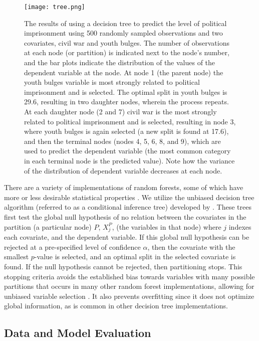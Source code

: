 \documentclass[12pt]{article}
\begin{document}
\begin{figure}[!htpb]
\centering
\texttt{[image: tree.png]}
\caption{The results of using a decision tree to predict the level of political imprisonment using 500 randomly sampled observations and two covariates, civil war and youth bulges. The number of observations at each node (or partition) is indicated next to the node's number, and the bar plots indicate the distribution of the values of the dependent variable at the node. At node 1 (the parent node) the youth bulges variable is most strongly related to political imprisonment and is selected. The optimal split in youth bulges is 29.6, resulting in two daughter nodes, wherein the process repeats. At each daughter node (2 and 7) civil war is the most strongly related to political imprisonment and is selected, resulting in node 3, where youth bulges is again selected (a new split is found at 17.6), and then the terminal nodes (nodes 4, 5, 6, 8, and 9), which are used to predict the dependent variable (the most common category in each terminal node is the predicted value). Note how the variance of the distribution of dependent variable decreases at each node.}
\label{fig:tree}
\end{figure}

There are a variety of implementations of random forests, some of which have more or less desirable statistical properties \citep{strobl2009introduction}. We utilize the unbiased decision tree algorithm (referred to as a conditional inference tree) developed by \citet{hothorn2006unbiased}. These trees first test the global null hypothesis of no relation between the covariates in the partition (a particular node) $P$, $X_j^P$, (the variables in that node) where $j$ indexes each covariate, and the dependent variable. If this global null hypothesis can be rejected at a pre-specified level of confidence $\alpha$, then the covariate with the smallest $p$-value is selected, and an optimal split in the selected covariate is found. If the null hypothesis cannot be rejected, then partitioning stops. This stopping criteria avoids the established bias towards variables with many possible partitions that occurs in many other random forest implementations, allowing for unbiased variable selection \citep{hothorn2006unbiased, strobl2007bias}. It also prevents overfitting since it does not optimize global  information, as is common in other decision tree implementations.

\subsection{Data and Model Evaluation}
\end{document}
